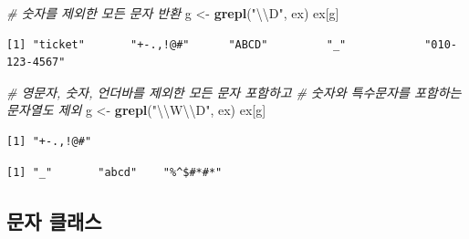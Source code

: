 \documentclass[
  11pt,
]{krantz}
\newenvironment{Shaded}{\begin{snugshade}}{\end{snugshade}}
\newcommand{\CharTok}[1]{\textcolor[rgb]{0.5,0.5,0.5}{#1}}
\newcommand{\CommentTok}[1]{\textcolor[rgb]{0.37,0.37,0.37}{\textit{#1}}}
\newcommand{\KeywordTok}[1]{\textcolor[rgb]{0.27,0.27,0.27}{\textbf{#1}}}
\newcommand{\NormalTok}[1]{#1}
\newcommand{\StringTok}[1]{\textcolor[rgb]{0.5,0.5,0.5}{#1}}
\begin{document}
\begin{Shaded}
\begin{Highlighting}[]
\CommentTok{# 숫자를 제외한 모든 문자 반환}
\NormalTok{g <-}\StringTok{ }\KeywordTok{grepl}\NormalTok{(}\StringTok{"}\CharTok{\textbackslash{}\textbackslash{}}\StringTok{D"}\NormalTok{, ex)}
\NormalTok{ex[g]}
\end{Highlighting}
\end{Shaded}

\begin{verbatim}
[1] "ticket"       "+-.,!@#"      "ABCD"         "_"            "010-123-4567"
\end{verbatim}

\begin{Shaded}
\begin{Highlighting}[]
\CommentTok{# 영문자, 숫자, 언더바를 제외한 모든 문자 포함하고}
\CommentTok{# 숫자와 특수문자를 포함하는 문자열도 제외}
\NormalTok{g <-}\StringTok{ }\KeywordTok{grepl}\NormalTok{(}\StringTok{"}\CharTok{\textbackslash{}\textbackslash{}}\StringTok{W}\CharTok{\textbackslash{}\textbackslash{}}\StringTok{D"}\NormalTok{, ex)}
\NormalTok{ex[g]}
\end{Highlighting}
\end{Shaded}

\begin{verbatim}
[1] "+-.,!@#"
\end{verbatim}

\begin{Shaded}
\end{Shaded}

\begin{verbatim}
[1] "_"       "abcd"    "%^$#*#*"
\end{verbatim}

\normalsize

\hypertarget{character-class}{%
\subsection{문자 클래스}\label{character-class}}
\end{document}
